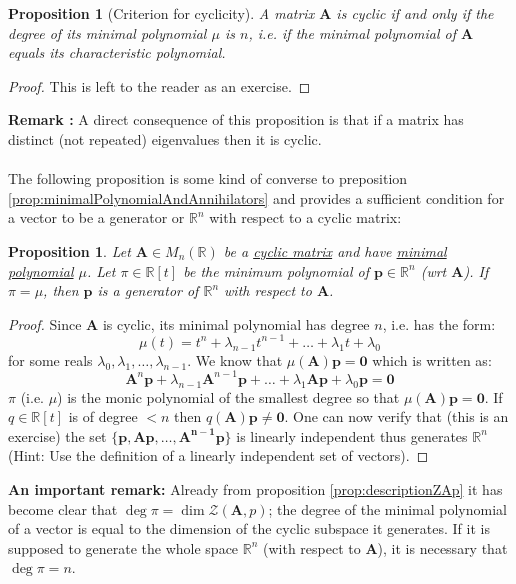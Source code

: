 \documentclass[a4paper,10pt,oneside]{book}
\newtheorem{proposition}[theorem]{Proposition}
\begin{document}
%
%
\begin{proposition}[Criterion for cyclicity]
 A matrix $\mathbf{A}$ is cyclic if and only if the degree of its minimal polynomial $\mu$ is $n$, i.e. if the minimal polynomial of $\mathbf{A}$ equals its characteristic polynomial.
\end{proposition}
\begin{proof}
 This is left to the reader as an exercise.
\end{proof}
%
\noindent \textbf{Remark :} A direct consequence of this proposition is that if a matrix has distinct (not repeated) eigenvalues then it is cyclic.\\
\\
\noindent The following proposition is some kind of converse to preposition \ref{prop:minimalPolynomialAndAnnihilators} and provides a sufficient condition for a vector to be a generator or $\mathbb{R}^n$ with respect to a cyclic matrix:
%
%
\begin{proposition}\label{prop:cyclicGeneratorMu=pi}
 Let $\mathbf{A}\in M_n(\mathbb{R})$ be a \hyperlink{def:cyclicMatrix}{cyclic matrix} and have \hyperlink{def:minimalPolynomial}{minimal polynomial} $\mu$. Let $\pi\in\mathbb{R}[t]$ be the minimum polynomial of $\mathbf{p}\in\mathbb{R}^n$ (\textit{wrt} $\mathbf{A}$). If $\pi=\mu$, then $\mathbf{p}$ is a generator of $\mathbb{R}^n$ with respect to $\mathbf{A}$. 
\end{proposition}
\begin{proof}
 Since $\mathbf{A}$ is cyclic, its minimal polynomial has degree $n$, i.e. has the form:
 \begin{equation}
  \mu(t)=t^n+\lambda_{n-1}t^{n-1}+\ldots+\lambda_1 t+\lambda_0
 \end{equation}
 for some reals $\lambda_0,\lambda_1,\ldots,\lambda_{n-1}$. We know that $\mu(\mathbf{A})\mathbf{p}=\mathbf{0}$ which is written as:
 \begin{equation}
  \mathbf{A}^n\mathbf{p}+\lambda_{n-1}\mathbf{A}^{n-1}\mathbf{p}+\ldots+\lambda_1 \mathbf{Ap}+\lambda_0\mathbf{p}=\mathbf{0}
 \end{equation}
 $\pi$ (i.e. $\mu$) is the monic polynomial of the smallest degree so that $\mu(\mathbf{A})\mathbf{p}=\mathbf{0}$. If $q\in\mathbb{R}[t]$ is of degree $<n$ then $q(\mathbf{A})\mathbf{p}\neq\mathbf{0}$. One can now verify that (this is an exercise) the set $\{\mathbf{p,\mathbf{Ap},\ldots,\mathbf{A}^{n-1}\mathbf{p}}\}$ is linearly independent thus generates $\mathbb{R}^n$ (Hint: Use the definition of a linearly independent set of vectors).
\end{proof}
%
%
\noindent \textbf{An important remark:} Already from proposition \ref{prop:descriptionZAp} it has become clear that $\operatorname{deg }\pi=\operatorname{dim}\mathcal{Z}(\mathbf{A},p)$; the degree of the minimal polynomial of a vector is equal to the dimension of the cyclic subspace it generates. If it is supposed to generate the whole space $\mathbb{R}^n$ (with respect to $\mathbf{A}$), it is necessary that $\operatorname{deg}\pi=n$.
\end{document}
